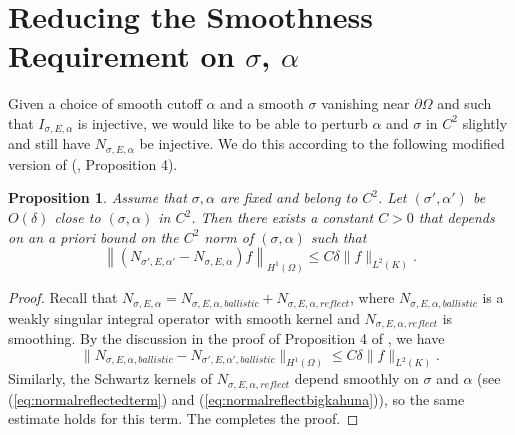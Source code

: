 \documentclass[10pt]{amsart}
\newtheorem{proposition}{Proposition}
\theoremstyle{definition}
\theoremstyle{definition}
\theoremstyle{definition}
\begin{document}
\section{Reducing the Smoothness Requirement on $\sigma$, $\alpha$ \label{sec:reducingsmoothness}}
Given a choice of smooth cutoff $\alpha$ and a smooth $\sigma$ vanishing near $\partial \Omega$ and such that $I_{\sigma, E, \alpha}$ is injective, we would like to be able to perturb $\alpha$ and $\sigma$ in $C^{2}$ slightly and still have $N_{\sigma, E,\alpha}$ be injective. We do this according to the following modified version of (\cite{xraygeneric}, Proposition 4).
\begin{proposition}Assume that $\sigma, \alpha$ are fixed and belong to $C^{2}$. Let $(\sigma', \alpha')$ be $O(\delta)$ close to $(\sigma, \alpha)$ in $C^{2}$. Then there exists a constant $C > 0$ that depends on an a priori bound on the $C^{2}$ norm of $(\sigma, \alpha)$ such that
\begin{equation}
\left\| (N_{\sigma', E, \alpha'} - N_{\sigma, E, \alpha})f \right\|_{H^{1}(\Omega)} \leq C \delta \|f\|_{L^{2}(K)}. 
\end{equation}\label{prop:normalperturb}
\end{proposition}

\begin{proof}
Recall that $N_{\sigma,E,\alpha} = N_{\sigma, E, \alpha, ballistic} + N_{\sigma, E, \alpha, reflect}$, where $N_{\sigma, E, \alpha, ballistic}$ is a weakly singular integral operator with smooth kernel and $N_{\sigma, E, \alpha, reflect}$ is smoothing. By the discussion in the proof of Proposition 4 of \cite{xraygeneric}, we have 
\begin{equation}
\|N_{\sigma, E, \alpha, ballistic} - N_{\sigma', E, \alpha', ballistic}\|_{H^{1}(\Omega)} \leq C \delta \|f\|_{L^{2}(K)}.
\end{equation}
Similarly, the Schwartz kernels of $N_{\sigma, E, \alpha, reflect}$ depend smoothly on $\sigma$ and $\alpha$ (see (\ref{eq:normalreflectedterm}) and (\ref{eq:normalreflectbigkahuna})), so the same estimate holds for this term. The completes the proof.
\end{proof}
\end{document}
